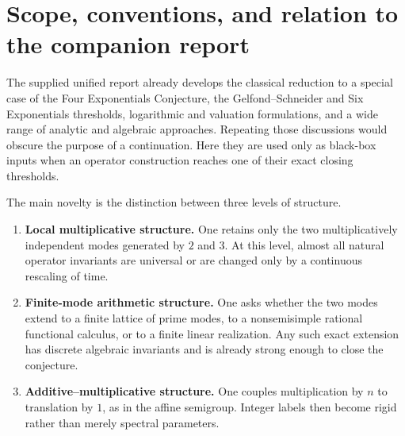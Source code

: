 \documentclass[11pt,oneside]{article}
\theoremstyle{definition}
\theoremstyle{remark}
\begin{document}
\begin{abstract}
No unconditional proof of the conjecture is claimed.  The report instead
isolates a sharp local-to-global obstruction and ranks concrete closing
targets.  The strongest small targets are: propagation to one third
multiplicatively independent algebraic base; one rational Jordan
self-extension; one finite prime-mode completion; one exact finite-Hankel
realization; or one additive affine coherence relation.  Each target is
proved sufficient, and the seductive operator invariants that merely
repackage the original \(2\times2\) exponential array are explicitly
separated from those that add genuinely new arithmetic information.
\end{abstract}

\tableofcontents
\newpage

\section{Scope, conventions, and relation to the companion report}

The supplied unified report already develops the classical reduction to a
special case of the Four Exponentials Conjecture, the
Gelfond--Schneider and Six Exponentials thresholds, logarithmic and
valuation formulations, and a wide range of analytic and algebraic
approaches.  Repeating those discussions would obscure the purpose of a
continuation.  Here they are used only as black-box inputs when an
operator construction reaches one of their exact closing thresholds.

The main novelty is the distinction between three levels of structure.

\begin{enumerate}
\item \textbf{Local multiplicative structure.}  One retains only the two
      multiplicatively independent modes generated by \(2\) and \(3\).
      At this level, almost all natural operator invariants are universal
      or are changed only by a continuous rescaling of time.
\item \textbf{Finite-mode arithmetic structure.}  One asks whether the
      two modes extend to a finite lattice of prime modes, to a
      nonsemisimple rational functional calculus, or to a finite linear
      realization.  Any such exact extension has discrete algebraic
      invariants and is already strong enough to close the conjecture.
\item \textbf{Additive--multiplicative structure.}  One couples
      multiplication by \(n\) to translation by \(1\), as in the affine
      semigroup.  Integer labels then become rigid rather than merely
      spectral parameters.
\end{enumerate}
\end{document}
